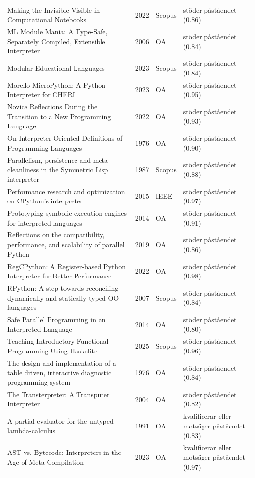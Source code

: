 \begin{longtable}{@{}%
  >{\raggedright\arraybackslash}p{}c%
  >{\raggedright\arraybackslash}p{}%
  >{\raggedright\arraybackslash}p{}@{}}
Making the Invisible Visible in Computational Notebooks & 2022 & Scopus & stöder påståendet (0.86) \\
ML Module Mania: A Type-Safe, Separately Compiled, Extensible Interpreter & 2006 & OA & stöder påståendet (0.84) \\
Modular Educational Languages & 2023 & Scopus & stöder påståendet (0.84) \\
Morello MicroPython: A Python Interpreter for CHERI & 2023 & OA & stöder påståendet (0.95) \\
Novice Reflections During the Transition to a New Programming Language & 2022 & OA & stöder påståendet (0.93) \\
On Interpreter-Oriented Definitions of Programming Languages & 1976 & OA & stöder påståendet (0.90) \\
Parallelism, persistence and meta-cleanliness in the Symmetric Lisp interpreter & 1987 & Scopus & stöder påståendet (0.88) \\
Performance research and optimization on CPython's interpreter & 2015 & IEEE & stöder påståendet (0.97) \\
Prototyping symbolic execution engines for interpreted languages & 2014 & OA & stöder påståendet (0.91) \\
Reflections on the compatibility, performance, and scalability of parallel Python & 2019 & OA & stöder påståendet (0.86) \\
RegCPython: A Register-based Python Interpreter for Better Performance & 2022 & OA & stöder påståendet (0.98) \\
RPython: A step towards reconciling dynamically and statically typed OO languages & 2007 & Scopus & stöder påståendet (0.84) \\
Safe Parallel Programming in an Interpreted Language & 2014 & OA & stöder påståendet (0.80) \\
Teaching Introductory Functional Programming Using Haskelite & 2025 & Scopus & stöder påståendet (0.96) \\
The design and implementation of a table driven, interactive diagnostic programming system & 1976 & OA & stöder påståendet (0.84) \\
The Transterpreter: A Transputer Interpreter & 2004 & OA & stöder påståendet (0.82) \\
A partial evaluator for the untyped lambda-calculus & 1991 & OA & kvalificerar eller motsäger påståendet (0.83) \\
AST vs. Bytecode: Interpreters in the Age of Meta-Compilation & 2023 & OA & kvalificerar eller motsäger påståendet (0.97) \\

\end{longtable}
